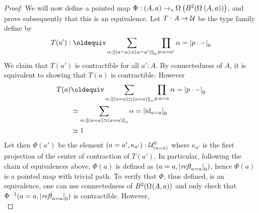 \begin{proof}
  We will now define a pointed map
  $\Phi : (A,a) \ptdto \loopspace \left( \BB (\loopspace {(A,a)})
  \right)$, and prove subsequently that this is an equivalence. Let
  $T : A \to {\mathcal{U}}$ be the type family define by
  \begin{displaymath}
    T(a') \defequi \sum_{\alpha:\setTrunc{(a=a)\weq(a=a')}}
    \prod_{p:a=a'}\alpha=\settrunc {p\cdot\blank}
  \end{displaymath}
  We claim that $T(a')$ is contractible for all $a':A$. By
  connectedness of $A$, it is equivalent to showing that $T(a)$ is
  contractible. However
  \begin{align*}
    T(a)
    &\jdeq \sum_{\alpha:\setTrunc{(a=a)\weq(a=a)}}\prod_{p:a=a}
      \alpha = \settrunc {p\cdot \blank}
    \\
    &\weq \sum_{\alpha:\setTrunc{(a=a)\weq(a=a)}} \alpha = \settrunc{\id_{a=a}}
    \\
    &\weq 1
  \end{align*}
  Let then $\Phi (a')$ be the element
  $(a=a', \kappa_{a'}):{{{\mathcal{U}}}^0_{\left(a=a\right)}}$ where $\kappa_{a'}$ is
  the first projection of the center of contraction of $T(a')$. In
  particular, following the chain of equivalences above, $\Phi(a)$ is
  defined as $(a=a, {\lvert\mathop{\mathit{refl}_{a=a}}\rvert}_0)$, hence $\Phi(a)$ is a
  pointed map with trivial path. To verify that $\Phi$, thus defined,
  is an equivalence, one can use connectedness of
  $\BB(\loopspace (A,a))$ and only check that
  $\Phi^{-1}(a=a,{\lvert\mathop{\mathit{refl}_{a=a}}\rvert}_0)$ is contractible. However,
  \begin{displaymath}

\end{displaymath}
\end{proof}

